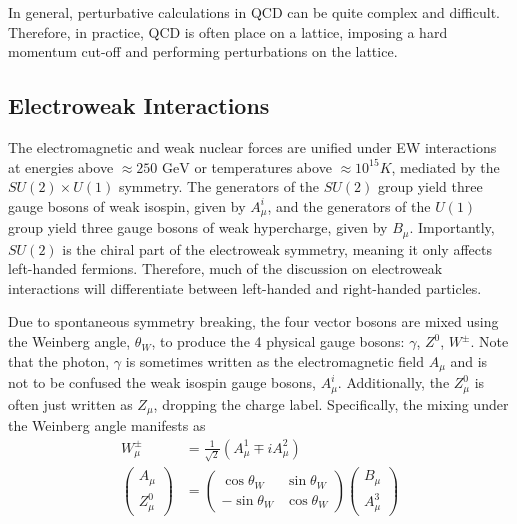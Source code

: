 In general, perturbative calculations in QCD can be quite complex and difficult. Therefore, in practice, QCD is often place on a lattice, imposing a hard momentum cut-off and performing perturbations on the lattice. 

\subsection{Electroweak Interactions}

The electromagnetic and weak nuclear forces are unified under EW interactions at energies above $\approx 250 \text{ GeV}$ or temperatures above $\approx10^{15}$\textdegree $K$, mediated by the $SU(2) \times U(1)$ symmetry. The generators of the $SU(2)$ group yield three gauge bosons of weak isospin, given by $A^i_{\mu}$, and the generators of the $U(1)$ group yield three gauge bosons of weak hypercharge, given by $B_{\mu}$. Importantly, $SU(2)$ is the chiral part of the electroweak symmetry, meaning it only affects left-handed fermions. Therefore, much of the discussion on electroweak interactions will differentiate between left-handed and right-handed particles.

Due to spontaneous symmetry breaking, the four vector bosons are mixed using the Weinberg angle, $\theta_W$, to produce the 4 physical gauge bosons: $\gamma$, $Z^0$, $W^\pm$. Note that the photon, $\gamma$ is sometimes written as the electromagnetic field $A_{\mu}$ and is not to be confused the weak isospin gauge bosons, $A_\mu^i$. Additionally, the $Z^0_{\mu}$ is often just written as $Z_{\mu}$, dropping the charge label. Specifically, the mixing under the Weinberg angle manifests as
\begin{equation}
    \begin{split}
    W^\pm_{\mu} &= \frac{1}{\sqrt{2}}(A^1_{\mu} \mp i A^2_{\mu}) \\
    \begin{pmatrix}
        A_{\mu} \\ Z^0_{\mu}
    \end{pmatrix} &= 
    \begin{pmatrix}
        \cos\theta_W & \sin\theta_W \\
        -\sin\theta_W & \cos\theta_W
    \end{pmatrix}
    \begin{pmatrix}
        B_{\mu} \\ A^3_{\mu}
    \end{pmatrix}
    \label{eq:Weinberg_mixing}
\end{split}
\end{equation}
    

